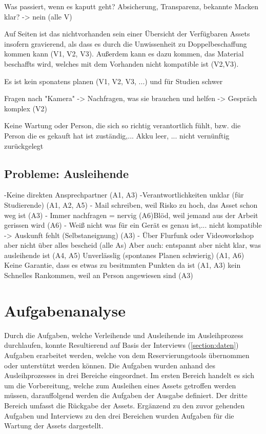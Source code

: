 Was passiert, wenn es kaputt geht? Absicherung, Transparenz, bekannte Macken klar? -> nein (alle
V)

Auf Seiten ist das nichtvorhanden sein einer Übersicht der Verfügbaren Assets insofern gravierend,
als dass es durch die Unwissenheit zu Doppelbeschaffung kommen kann (V1, V2, V3). Außerdem kann es
dazu kommen, das Material beschaffts wird, welches mit dem Vorhanden nicht kompatible ist (V2,V3).

Es ist kein sponatens planen (V1, V2, V3, ...) und für Studien schwer

Fragen nach "Kamera" -> Nachfragen, was sie brauchen und helfen -> Gespräch komplex (V2) 

Keine Wartung oder Person, die sich so richtig verantortlich fühlt, bzw. die Person die es gekauft
hat ist zuständig,... Akku leer, ... nicht vernünftig zurückgelegt
\subsection*{Probleme: Ausleihende}
-Keine direkten Ansprechpartner (A1, A3)
-Verantwortlichkeiten unklar (für Studierende) (A1, A2, A5)
- Mail schreiben, weil Risko zu hoch, das Asset schon weg ist (A3)
- Immer nachfragen = nervig (A6)Blöd, weil jemand aus der Arbeit gerissen wird (A6)
- Weiß nicht was für ein Gerät es genau ist,... nicht kompatible -> Auskunft fehlt
(Selbstaneignung) (A3)
- Über Flurfunk oder Videoworkshop aber nicht über alles bescheid (alle As)
Aber auch: entspannt aber nicht klar, was ausleihende ist (A4, A5)
Unverlässlig (spontanes Planen schwierig) (A1, A6)
Keine Garantie, dass es etwas zu besitmmten Punkten da ist (A1, A3)
kein Schnelles Rankommen, weil an Person angewiesen sind (A3)

        

\section{Aufgabenanalyse}
\label{section:aufgaben}
Durch die Aufgaben, welche Verleihende und Ausleihende im Ausleihprozess durchlaufen, konnte
Resultierend auf Basis der Interviews (\ref{section:daten}) Aufgaben erarbeitet werden, welche von
dem Reservierungstools übernommen oder unterstützt werden können. Die Aufgaben wurden anhand des
Ausleihprozesses in drei Bereiche eingeordnet. Im ersten Bereich handelt es sich um die
Vorbereitung, welche zum Ausleihen eines Assets getroffen werden müssen, darauffolgend werden die
Aufgaben der Ausgabe definiert. Der dritte Bereich umfasst die Rückgabe der Assets. Ergänzend zu den
zuvor gehenden Aufgaben und Interviews zu den drei Bereichen wurden Aufgaben für die Wartung der
Assets dargestellt.

